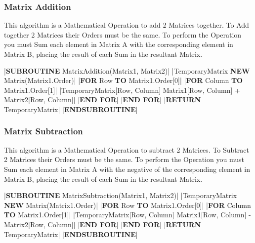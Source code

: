 \begin{flushleft}
            \subsubsection{Matrix Addition}
                This algorithm is a Mathematical Operation to add 2 Matrices together. To Add together 2 Matrices their Orders
                must be the same. To perform the Operation you must Sum each element in Matrix A with the corresponding element 
                in Matrix B, placing the result of each Sum in the resultant Matrix.

                \vspace{0.2cm}
                \begin{pseudocode}
|\textbf{SUBROUTINE} MatrixAddition(Matrix1, Matrix2)|
    |TemporaryMatrix \leftarrow \textbf{NEW} Matrix(Matrix1.Order)|
    |\textbf{FOR} Row  \textbf{TO} Matrix1.Order[0]|
        |\textbf{FOR} Column  \textbf{TO} Matrix1.Order[1]|
            |TemporaryMatrix[Row, Column] \leftarrow Matrix1[Row, Column] + Matrix2[Row, Column]|
        |\textbf{END FOR}|
    |\textbf{END FOR}|
    |\textbf{RETURN} TemporaryMatrix|
|\textbf{ENDSUBROUTINE}|
                \end{pseudocode}

                \vspace{0.5cm}
            \subsubsection{Matrix Subtraction}
                This algorithm is a Mathematical Operation to subtract 2 Matrices. To Subtract 2 Matrices their Orders
                must be the same. To perform the Operation you must Sum each element in Matrix A with the negative of the 
                corresponding element in Matrix B, placing the result of each Sum in the resultant Matrix.

                \vspace{0.2cm}
                \begin{pseudocode}
|\textbf{SUBROUTINE} MatrixSubtraction(Matrix1, Matrix2)|
    |TemporaryMatrix \leftarrow \textbf{NEW} Matrix(Matrix1.Order)|
    |\textbf{FOR} Row  \textbf{TO} Matrix1.Order[0]|
        |\textbf{FOR} Column  \textbf{TO} Matrix1.Order[1]|
            |TemporaryMatrix[Row, Column] \leftarrow Matrix1[Row, Column] - Matrix2[Row, Column]|
        |\textbf{END FOR}|
    |\textbf{END FOR}|
    |\textbf{RETURN} TemporaryMatrix|
|\textbf{ENDSUBROUTINE}|
                \end{pseudocode}


\end{flushleft}
